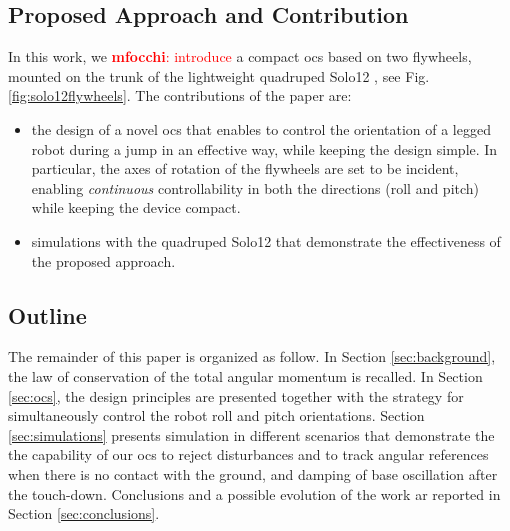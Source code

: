 \documentclass[sensors,article,submit,pdftex,moreauthors]{Definitions/mdpi}
\newcommand{\MF}[1]{\textcolor{red}{\textbf{mfocchi}: #1}}
\begin{document}
\subsection{Proposed Approach and Contribution}
In this work, we \MF{introduce} a compact \gls{ocs} based on two flywheels, mounted on the trunk of the lightweight quadruped Solo12 \cite{grimminger2020open}, see Fig. \ref{fig:solo12flywheels}.
The contributions of the paper are:
\begin{itemize}
	\item the design of a novel \gls{ocs} that enables to control the orientation of a legged robot during a jump in an effective way, while keeping the design simple. 
	In particular, the axes of rotation of the flywheels are set to be incident, enabling \textit{continuous} controllability in both the directions (roll and pitch) while keeping the device compact.
	\item simulations  with the quadruped Solo12 that demonstrate the effectiveness of the proposed approach.
\end{itemize}



\subsection{Outline}
The remainder of this paper is organized as follow. In Section \ref{sec:background}, the law of conservation of the total angular momentum is recalled. In Section \ref{sec:ocs}, the design principles are presented together with the strategy for simultaneously control the robot roll and pitch orientations. Section \ref{sec:simulations} presents simulation in different scenarios that demonstrate the the capability of our \gls{ocs} to reject disturbances and to track angular references when there is no contact with the ground, and damping of base oscillation after the touch-down. Conclusions and a possible evolution of the work ar reported in Section \ref{sec:conclusions}.
\end{document}
